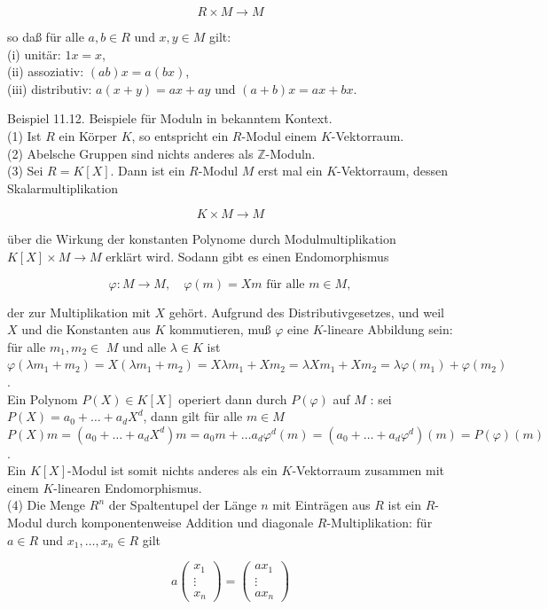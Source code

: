 \documentclass[10pt, letterpaper]{article}
\begin{document}
$$
R \times M \rightarrow M
$$

so daß für alle $a, b \in R$ und $x, y \in M$ gilt:\\
(i) unitär: $1 x=x$,\\
(ii) assoziativ: $(a b) x=a(b x)$,\\
(iii) distributiv: $a(x+y)=a x+a y$ und $(a+b) x=a x+b x$.

Beispiel 11.12. Beispiele für Moduln in bekanntem Kontext.\\
(1) Ist $R$ ein Körper $K$, so entspricht ein $R$-Modul einem $K$-Vektorraum.\\
(2) Abelsche Gruppen sind nichts anderes als $\mathbb{Z}$-Moduln.\\
(3) Sei $R=K[X]$. Dann ist ein $R$-Modul $M$ erst mal ein $K$-Vektorraum, dessen Skalarmultiplikation

$$
K \times M \rightarrow M
$$

über die Wirkung der konstanten Polynome durch Modulmultiplikation $K[X] \times M \rightarrow M$ erklärt wird. Sodann gibt es einen Endomorphismus

$$
\varphi: M \rightarrow M, \quad \varphi(m)=X m \text { für alle } m \in M,
$$

der zur Multiplikation mit $X$ gehört. Aufgrund des Distributivgesetzes, und weil $X$ und die Konstanten aus $K$ kommutieren, muß $\varphi$ eine $K$-lineare Abbildung sein: für alle $m_{1}, m_{2} \in$ $M$ und alle $\lambda \in K$ ist\\
$\varphi\left(\lambda m_{1}+m_{2}\right)=X\left(\lambda m_{1}+m_{2}\right)=X \lambda m_{1}+X m_{2}=\lambda X m_{1}+X m_{2}=\lambda \varphi\left(m_{1}\right)+\varphi\left(m_{2}\right)$.\\
Ein Polynom $P(X) \in K[X]$ operiert dann durch $P(\varphi)$ auf $M$ : sei $P(X)=a_{0}+\ldots+a_{d} X^{d}$, dann gilt für alle $m \in M$\\
$P(X) m=\left(a_{0}+\ldots+a_{d} X^{d}\right) m=a_{0} m+\ldots a_{d} \varphi^{d}(m)=\left(a_{0}+\ldots+a_{d} \varphi^{d}\right)(m)=P(\varphi)(m)$.\\
Ein $K[X]$-Modul ist somit nichts anderes als ein $K$-Vektorraum zusammen mit einem $K$-linearen Endomorphismus.\\
(4) Die Menge $R^{n}$ der Spaltentupel der Länge $n$ mit Einträgen aus $R$ ist ein $R$-Modul durch komponentenweise Addition und diagonale $R$-Multiplikation: für $a \in R$ und $x_{1}, \ldots, x_{n} \in R$ gilt

$$
a\left(\begin{array}{c}
x_{1} \\
\vdots \\
x_{n}
\end{array}\right)=\left(\begin{array}{c}
a x_{1} \\
\vdots \\
a x_{n}
\end{array}\right)
$$
\end{document}
